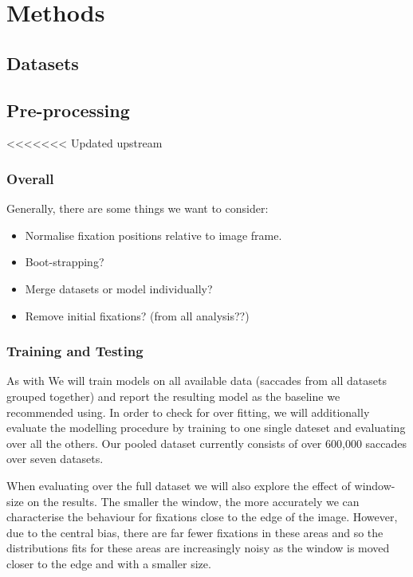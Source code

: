 \documentclass[a4paper, onecolumn, oneside, 11pt]{article}
\begin{document}
\section{Methods}

\subsection{Datasets}

\subsection{Pre-processing}
<<<<<<< Updated upstream

\subsubsection{Overall}
Generally, there are some things we want to consider:
\begin{itemize}
\item Normalise fixation positions relative to image frame. 
\item Boot-strapping? 
\item Merge datasets or model individually? 
\item Remove initial fixations? (from all analysis??)
\end{itemize} 

\subsubsection{Training and Testing}

As with \cite{clarke-tatler2014} We will train models on all available data (saccades from all datasets grouped together) and report the resulting model as the baseline we recommended using. In order to check for over fitting, we will additionally evaluate the modelling procedure by training to one single dateset and evaluating over all the others. Our pooled dataset currently consists of over 600,000 saccades over seven datasets. 

When evaluating over the full dataset we will also explore the effect of window-size on the results. The smaller the window, the more accurately we can characterise the behaviour for fixations close to the edge of the image. However, due to the central bias, there are far fewer fixations in these areas and so the distributions fits for these areas are increasingly noisy as the window is moved closer to the edge and with a smaller size. 
\end{document}
